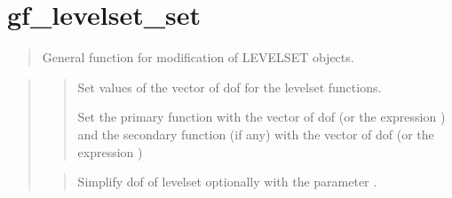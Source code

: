 \documentclass[a4paper,11pt,english]{sphinxmanual}
\begin{document}
\section{gf\_levelset\_set}
\label{\detokenize{matlab_octave/cmdref_gf_levelset_set:gf-levelset-set}}\label{\detokenize{matlab_octave/cmdref_gf_levelset_set::doc}}

\begin{sphinxVerbatim}[commandchars=\\\{\}]
     \PYG{p}{[}   \PYG{p}{]}
  \PYG{p}{[}  \PYG{p}{]}
\end{sphinxVerbatim}

\begin{quote}

General function for modification of LEVELSET objects.
\end{quote}

\begin{quote}

\begin{quote}

Set values of the vector of dof for the level\sphinxhyphen{}set functions.

Set the primary function with the vector of dof  (or the expression
) and the secondary function (if any) with  the vector of dof
 (or the expression )
\end{quote}

\begin{quote}

Simplify dof of level\sphinxhyphen{}set optionally with the parameter .
\end{quote}
\end{quote}
\end{document}
